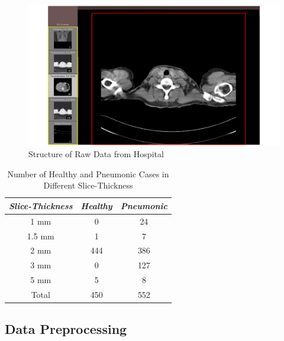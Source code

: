 \documentclass[runningheads]{llncs}
\begin{document}
\begin{figure}[t]
    \centerline{\includegraphics[width=150mm]{reader.pdf}}
    \vspace{-0cm}
    \caption{Structure of Raw Data from Hospital}
    \vspace{-0cm}
    \label{reader}
    \end{figure}

\begin{table}[htb]
\vspace{-0cm}
\caption{Number of Healthy and Pneumonic Cases in Different Slice-Thickness}
\vspace{-0cm}
\begin{center}
\begin{tabular}{|c|c|c|}
\hline
\textbf{\textit{Slice-Thickness}}& \textbf{\textit{Healthy}}& \textbf{\textit{Pneumonic}}  \\
\hline
1 mm & 0 & 24 \\
1.5 mm  & 1 & 7\\
2 mm & 444 & 386  \\
3 mm & 0 & 127  \\
5 mm & 5 & 8  \\
\hline
Total & 450 & 552 \\
\hline
\end{tabular}
\vspace{-0cm}
\label{distributionofhealthyandpneumonic}
\end{center}
\vspace{-0cm}
\end{table}

\subsection{Data Preprocessing}
\label{preprocessing}
\end{document}
